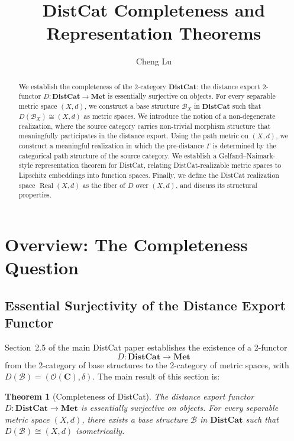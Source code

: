\documentclass[11pt,a4paper]{article}
\title{DistCat Completeness and Representation Theorems}
\author{Cheng Lu}
\date{}
\newtheorem{theorem}{Theorem}[section]
\begin{document}
\maketitle

\begin{abstract}
We establish the completeness of the 2-category $\mathbf{DistCat}$: the distance export 2-functor $D:\mathbf{DistCat}\to\mathbf{Met}$ is essentially surjective on objects. For every separable metric space $(X,d)$, we construct a base structure $\mathcal{B}_X$ in $\mathbf{DistCat}$ such that $D(\mathcal{B}_X)\cong(X,d)$ as metric spaces. We introduce the notion of a non-degenerate realization, where the source category carries non-trivial morphism structure that meaningfully participates in the distance export. Using the path metric on $(X,d)$, we construct a meaningful realization in which the pre-distance $\Gamma$ is determined by the categorical path structure of the source category. We establish a Gelfand--Naimark-style representation theorem for DistCat, relating DistCat-realizable metric spaces to Lipschitz embeddings into function spaces. Finally, we define the DistCat realization space $\operatorname{Real}(X,d)$ as the fiber of $D$ over $(X,d)$, and discuss its structural properties.
\end{abstract}

\section{Overview: The Completeness Question}

\subsection{Essential Surjectivity of the Distance Export Functor}

Section~2.5 of the main DistCat paper establishes the existence of a 2-functor
\[
D:\mathbf{DistCat}\longrightarrow\mathbf{Met}
\]
from the 2-category of base structures to the 2-category of metric spaces,
with $D(\mathcal{B})=(\mathcal{O}(\mathbf{C}),\delta)$. The main result of this
section is:

\begin{theorem}[Completeness of DistCat]\label{thm:completeness}
The distance export functor $D:\mathbf{DistCat}\to\mathbf{Met}$ is essentially
surjective on objects. For every separable metric space $(X,d)$, there exists
a base structure $\mathcal{B}$ in $\mathbf{DistCat}$ such that
$D(\mathcal{B})\cong(X,d)$ isometrically.
\end{theorem}
\end{document}
